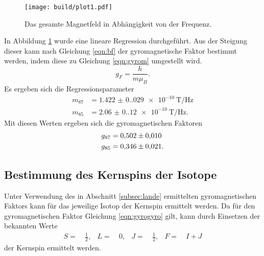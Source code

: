 \begin{figure}[H]
  \centering
  \texttt{[image: build/plot1.pdf]}
  \caption{Das gesamte Magnetfeld in Abhängigkeit von der Frequenz.}
  \label{fig:magnetfeld1}
\end{figure}
\noindent
In Abbildung \ref{fig:magnetfeld1} wurde eine lineare Regression durchgeführt.
Aus der Steigung dieser kann nach Gleichung \ref{eqn:bf} der gyromagnetische
Faktor bestimmt werden, indem diese zu Gleichung \ref{eqn:gyrom} umgestellt wird.
\begin{equation}
  g_{F} = \frac{h}{m \mu_{B}}.
  \label{eqn:gyrom}
\end{equation}
\noindent
Es ergeben sich die Regressionsparameter
\begin{align}
  m_{87}  & =  \SI{1.422(0.029)e-10}{\tesla\per\hertz}\\
  m_{85}  & =  \SI{2.06(0.12)e-10}{\tesla\per\hertz}.
\end{align}
\noindent
Mit diesen Werten ergeben sich die gyromagnetischen Faktoren
\begin{align}
	g_{87} & = \num{0.502+-0.01}\\
  g_{85} & = \num{0.346+-0.021}.
\end{align}
\noindent

\subsection{Bestimmung des Kernspins der Isotope}
\label{subsec:kernspin}
Unter Verwendung des in Abschnitt \ref{subsec:lande} ermittelten gyromagnetischen
Faktors kann für das jeweilige Isotop der Kernspin ermittelt werden. Da für den
gyromagnetischen Faktor Gleichung \ref{eqn:gyrogyro} gilt, kann durch Einsetzen
der bekannten Werte
\begin{align}
S =\ & \frac{1}{2}, & L =\ & 0, & J =\ & \frac{1}{2}, & F =\ & I + J
\end{align}
der Kernspin ermittelt werden.

